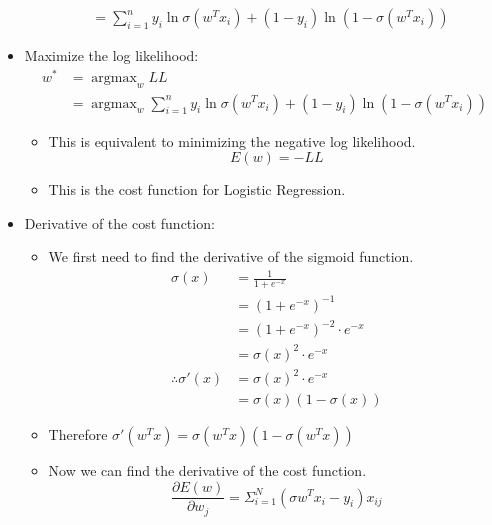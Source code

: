 \documentclass[12pt]{article}
\DeclareMathOperator*{\argmax}{argmax}
\begin{document}
\begin{itemize}
\begin{align*}
                    & = \sum_{i = 1}^n {y_i}\ln \sigma({w^T}x_i) + {(1 - y_i)}\ln(1 - \sigma({w^T}x_i))
                \end{align*}
                \item Maximize the log likelihood:
                \begin{align*}
                    w^* &= \argmax_w LL \\
                    &= \argmax_w \sum_{i = 1}^n {y_i}\ln \sigma({w^T}x_i) + {(1 - y_i)}\ln(1 - \sigma({w^T}x_i))
                \end{align*}
                \begin{itemize}
                    \item This is equivalent to minimizing the negative log likelihood.
                    \begin{equation}
                        E(w) = -LL
                    \end{equation}
                    \item This is the cost function for Logistic Regression.
                \end{itemize}
                \item Derivative of the cost function:
                \begin{itemize}
                    \item We first need to find the derivative of the sigmoid function.
                    \begin{align*}
                        \sigma(x) &= \frac{1}{1 + e^{-x}} \\
                        &= {(1 + e^{-x})}^{-1} \\
                        &= {(1 + e^{-x})}^{-2} \cdot e^{-x} \\
                        &= \sigma{(x)}^2 \cdot e^{-x} \\
                        \therefore \sigma'(x) &= \sigma{(x)}^2 \cdot e^{-x} \\
                        &= \sigma(x)(1 - \sigma(x))
                    \end{align*}
                    \item Therefore $\sigma'({w^T}x) = \sigma({w^T}x)(1 - \sigma({w^T}x))$
                    \item Now we can find the derivative of the cost function.
                    \begin{equation*}
                        \frac{\partial{}E(w)}{\partial{}w_j} = \Sigma_{i=1}^N(\sigma{w^T}x_i - y_i)x_{ij}

\end{equation*}
\end{itemize}
\end{itemize}
\end{document}
